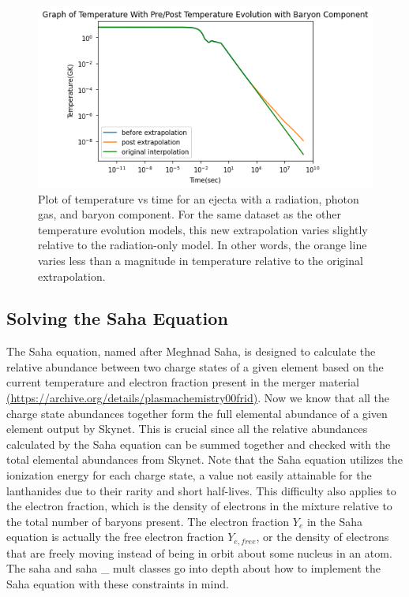 \documentclass[11pt,a4paper]{article}
\begin{document}
\begin{figure}[H]
  \includegraphics[scale = .7]{photon_baryon.png}
  \centering
  \caption{Plot of temperature vs time for an ejecta with a radiation, photon gas, and baryon component. For the same dataset as the other temperature evolution models, this new extrapolation varies slightly relative to the radiation-only model. In other words, the orange line varies less than a magnitude in temperature relative to the original extrapolation. }
\end{figure} 

\pagebreak

\subsection{Solving the Saha Equation}

The Saha equation, named after Meghnad Saha, is designed to calculate the relative abundance between two charge states of a given element based on the current temperature and electron fraction present in the merger material \url{(https://archive.org/details/plasmachemistry00frid)}. Now we know that all the charge state abundances together form the full elemental abundance of a given element output by Skynet. This is crucial since all the relative abundances calculated by the Saha equation can be summed together and checked with the total elemental abundances from Skynet. Note that the Saha equation utilizes the ionization energy for each charge state, a value not easily attainable for the lanthanides due to their rarity and short half-lives. This difficulty also applies to the electron fraction, which is the density of electrons in the mixture relative to the total number of baryons present. The electron fraction $Y_e$ in the Saha equation is actually the free electron fraction $Y_{e,free}$, or the density of electrons that are freely moving instead of being in orbit about some nucleus in an atom. The saha and saha \_ mult classes go into depth about how to implement the Saha equation with these constraints in mind.  \\
\end{document}
